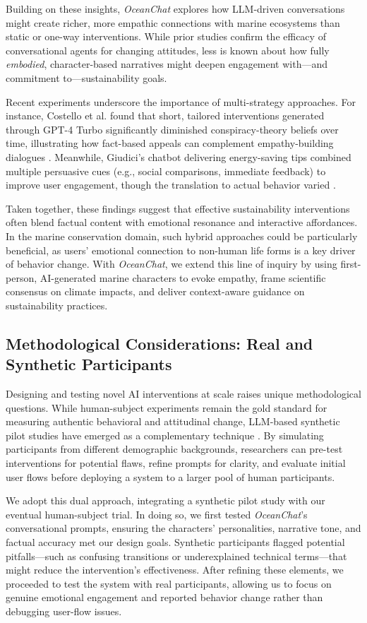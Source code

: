 Building on these insights, \textit{OceanChat} explores how LLM-driven conversations might create richer, more empathic connections with marine ecosystems than static or one-way interventions. While prior studies confirm the efficacy of conversational agents for changing attitudes, less is known about how fully \textit{embodied}, character-based narratives might deepen engagement with—and commitment to—sustainability goals.

Recent experiments underscore the importance of multi-strategy approaches. For instance, Costello et al. found that short, tailored interventions generated through GPT-4 Turbo significantly diminished conspiracy-theory beliefs over time, illustrating how fact-based appeals can complement empathy-building dialogues \cite{Costello2024}. Meanwhile, Giudici’s chatbot delivering energy-saving tips combined multiple persuasive cues (e.g., social comparisons, immediate feedback) to improve user engagement, though the translation to actual behavior varied \cite{Giudici2024}.

Taken together, these findings suggest that effective sustainability interventions often blend factual content with emotional resonance and interactive affordances. In the marine conservation domain, such hybrid approaches could be particularly beneficial, as users’ emotional connection to non-human life forms is a key driver of behavior change. With \textit{OceanChat}, we extend this line of inquiry by using first-person, AI-generated marine characters to evoke empathy, frame scientific consensus on climate impacts, and deliver context-aware guidance on sustainability practices.

\subsection{Methodological Considerations: Real and Synthetic Participants}
Designing and testing novel AI interventions at scale raises unique methodological questions. While human-subject experiments remain the gold standard for measuring authentic behavioral and attitudinal change, LLM-based synthetic pilot studies have emerged as a complementary technique \cite{SyntheticStudy2023, Long2024}. By simulating participants from different demographic backgrounds, researchers can pre-test interventions for potential flaws, refine prompts for clarity, and evaluate initial user flows before deploying a system to a larger pool of human participants.

We adopt this dual approach, integrating a synthetic pilot study with our eventual human-subject trial. In doing so, we first tested \textit{OceanChat}’s conversational prompts, ensuring the characters’ personalities, narrative tone, and factual accuracy met our design goals. Synthetic participants flagged potential pitfalls—such as confusing transitions or underexplained technical terms—that might reduce the intervention’s effectiveness. After refining these elements, we proceeded to test the system with real participants, allowing us to focus on genuine emotional engagement and reported behavior change rather than debugging user-flow issues.

